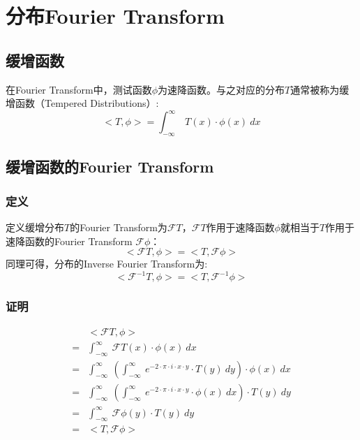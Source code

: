 \section{分布Fourier Transform}
\subsection{缓增函数}
在Fourier Transform中，测试函数$\phi$为速降函数。与之对应的分布$T$通常被称为缓增函数（Tempered Distributions）:
$$
	<T,\phi>=\int_{-\infty}^{\infty}\ T(x)\cdot \phi(x)\ dx
$$
\subsection{缓增函数的Fourier Transform}
\subsubsection{定义}
定义缓增分布$T$的Fourier Transform为$\mathcal{F}T$，$\mathcal{F}T$作用于速降函数$\phi$就相当于$T$作用于速降函数的Fourier Transform $\mathcal{F}\phi$：
\begin{equation}
	<\mathcal{F}T,\phi>=<T,\mathcal{F}\phi>
\end{equation}
同理可得，分布的Inverse Fourier Transform为:
\begin{equation}
	<\mathcal{F}^{-1}T,\phi>=<T,\mathcal{F}^{-1}\phi>
\end{equation}
\subsubsection{证明}
\begin{align*}
	  & <\mathcal{F}T,\phi>                                                                                                     \\
	= & \int_{-\infty}^{\infty}\ \mathcal{F}T(x)\cdot \phi(x)\ dx                                                               \\
	= & \int_{-\infty}^{\infty}\ (\int_{-\infty}^{\infty}\ e^{-2\cdot \pi\cdot i\cdot x\cdot y}\cdot T(y)\ dy)\cdot \phi(x)\ dx \\
	= & \int_{-\infty}^{\infty}\ (\int_{-\infty}^{\infty}\ e^{-2\cdot \pi\cdot i\cdot x\cdot y}\cdot \phi(x)\ dx)\cdot T(y)\ dy \\
	= & \int_{-\infty}^{\infty}\ \mathcal{F}\phi(y)\cdot T(y)\ dy                                                               \\
	= & <T,\mathcal{F}\phi>
\end{align*}

